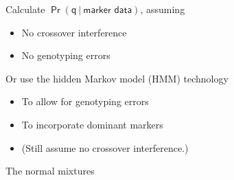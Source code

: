 \documentclass[12pt]{article}
\newcommand{\headsize}{\fontsize{35}{35} \selectfont}
\newcommand{\smallersize}{\fontsize{20}{25} \selectfont}
\begin{document}
\hfill
\begin{minipage}{10in}
\color{mywhite} \smallersize
Calculate {\color{myblue} $\mathsf{\Pr(q \ | \ \text{marker data})}$}, assuming
\begin{itemize}
\item No crossover interference
\item No genotyping errors
\end{itemize}

\vspace{10mm}

Or use the {\color{mypink} hidden Markov model (HMM)} technology
\begin{itemize}
\item To allow for genotyping errors
\item To incorporate dominant markers
\item {\color{myblue} (Still assume no crossover interference.)}
\end{itemize}
\end{minipage}




\newpage

\headsize \color{myyellow}
\hfill \begin{minipage}{5.75in}
\centering
The normal mixtures
\end{minipage}

\vspace{15mm}
\end{document}
